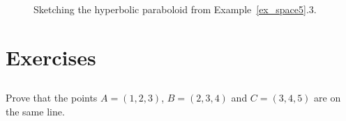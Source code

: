 \begin{example}
\begin{enumerate}[align=left]
			\begin{figure}[H]
\centering
\centerline{
\hspace{0.1cm}
}
\caption{Sketching the hyperbolic paraboloid from Example~\ref{ex_space5}.3.}
\end{figure}

\end{enumerate}
\end{example}

\section{Exercises}

\renewcommand{\ExerciseListName}{Opgave}
\subsection*{}
\begin{Exercise}[difficulty = 1] Prove that the points $A=(1,2,3)$, $B=(2,3,4)$ and $C=(3,4,5)$ are on the same line.
\end{Exercise}

